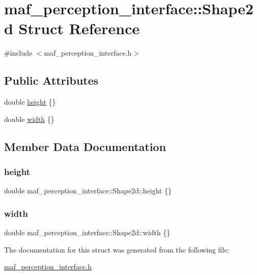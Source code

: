 \hypertarget{structmaf__perception__interface_1_1Shape2d}{}\section{maf\+\_\+perception\+\_\+interface\+:\+:Shape2d Struct Reference}
\label{structmaf__perception__interface_1_1Shape2d}


{\ttfamily \#include $<$maf\+\_\+perception\+\_\+interface.\+h$>$}

\subsection*{Public Attributes}
\begin{DoxyCompactItemize}
\item 
double \hyperlink{structmaf__perception__interface_1_1Shape2d_a0ceee686a6fbbef110216ecaa214130b}{height} \{\}
\item 
double \hyperlink{structmaf__perception__interface_1_1Shape2d_ad95b6dc54b3b3e3654043feb7bdc5b5d}{width} \{\}
\end{DoxyCompactItemize}


\subsection{Member Data Documentation}
\mbox{\label{structmaf__perception__interface_1_1Shape2d_a0ceee686a6fbbef110216ecaa214130b}} 
\subsubsection{\texorpdfstring{height}{height}}
{\footnotesize\ttfamily double maf\+\_\+perception\+\_\+interface\+::\+Shape2d\+::height \{\}}

\mbox{\label{structmaf__perception__interface_1_1Shape2d_ad95b6dc54b3b3e3654043feb7bdc5b5d}} 
\subsubsection{\texorpdfstring{width}{width}}
{\footnotesize\ttfamily double maf\+\_\+perception\+\_\+interface\+::\+Shape2d\+::width \{\}}



The documentation for this struct was generated from the following file\+:\begin{DoxyCompactItemize}
\item 
\hyperlink{maf__perception__interface_8h}{maf\+\_\+perception\+\_\+interface.\+h}\end{DoxyCompactItemize}
